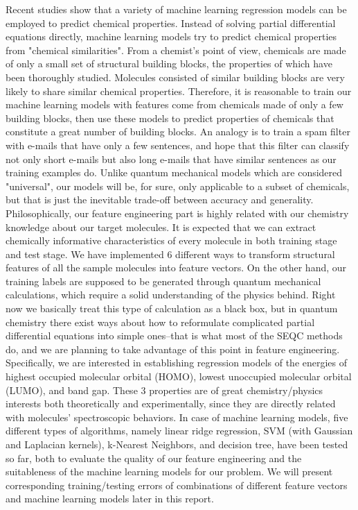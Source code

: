 \documentclass[12pt, oneside]{article}   	%
\begin{document}
Recent studies show that a variety of machine learning regression models can be employed to predict chemical properties. Instead of solving partial differential equations directly, machine learning models try to predict chemical properties from "chemical similarities". From a chemist's point of view, chemicals are made of only a small set of structural building blocks, the properties of which have been thoroughly studied. Molecules consisted of similar building blocks are very likely to share similar chemical properties. Therefore, it is reasonable to train our machine learning models with features come from chemicals made of only a few building blocks, then use these models to predict properties of chemicals that constitute a great number of building blocks. An analogy is to train a spam filter with e-mails that have only a few sentences, and hope that this filter can classify not only short e-mails but also long e-mails that have similar sentences as our training examples do. Unlike quantum mechanical models which are considered "universal", our models will be, for sure, only applicable to a subset of chemicals, but that is just the inevitable trade-off between accuracy and generality. \\

Philosophically, our feature engineering part is highly related with our chemistry knowledge about our target molecules. It is expected that we can extract chemically informative characteristics of every molecule in both training stage and test stage. We have implemented 6 different ways to transform structural features of all the sample molecules into feature vectors. On the other hand, our training labels are supposed to be generated through quantum mechanical calculations, which require a solid understanding of the physics behind. Right now we basically treat this type of calculation as a black box, but in quantum chemistry there exist ways about how to reformulate complicated partial differential equations into simple ones--that is what most of the SEQC methods do, and we are planning to take advantage of this point in feature engineering. Specifically, we are interested in establishing regression models of the energies of highest occupied molecular orbital (HOMO), lowest unoccupied molecular orbital (LUMO), and band gap. These 3 properties are of great chemistry/physics interests both theoretically and experimentally, since they are directly related with molecules' spectroscopic behaviors. In case of machine learning models, five different types of algorithms, namely linear ridge regression, SVM (with Gaussian and Laplacian kernels), k-Nearest Neighbors, and decision tree, have been tested so far, both to evaluate the quality of our feature engineering and the suitableness of the machine learning models for our problem. We will present corresponding training/testing errors of combinations of different feature vectors and machine learning models later in this report. \\
\end{document}
